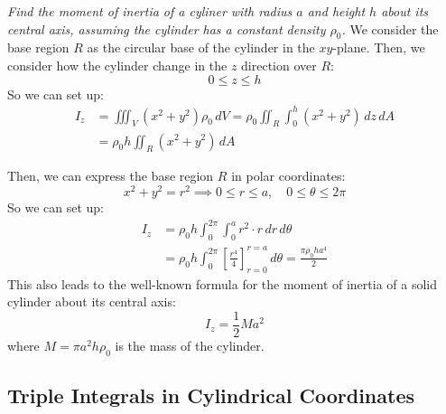 \documentclass[11pt]{report}
\begin{document}
\begin{example}
    \textit{Find the moment of inertia of a cyliner with radius $a$ and height $h$ about its central axis, assuming the cylinder has a constant density $\rho_0$.}
    We consider the base region $R$ as the circular base of the cylinder in the $xy$-plane. Then, we consider how the cylinder change in the $z$ direction over $R$:
    $$
        0 \le z \le h
    $$
    So we can set up:
    \begin{align*}
        I_z &= \iiint_V (x^2 + y^2) \rho_0 \, dV = \rho_0 \iint_R \int_0^h (x^2 + y^2) \, dz \, dA \\
        &= \rho_0 h \iint_R (x^2 + y^2) \, dA
    \end{align*}

    Then, we can express the base region $R$ in polar coordinates:
    $$        
    x^2 + y^2 = r^2 \implies 0 \le r \le a, \quad 0 \le \theta \le 2\pi
    $$
    So we can set up:
    \begin{align*}
        I_z &= \rho_0 h \int_0^{2\pi} \int_0^a r^2 \cdot r \, dr \, d\theta \\
        &= \rho_0 h \int_0^{2\pi} \left[ \frac{r^4}{4} \right]_{r=0}^{r=a} \, d\theta = \frac{\pi \rho_0 h a^4}{2}
    \end{align*}
    This also leads to the well-known formula for the moment of inertia of a solid cylinder about its central axis:
    $$
        I_z = \frac{1}{2} M a^2
    $$
    where $M = \pi a^2 h \rho_0$ is the mass of the cylinder. 
\end{example}
\subsection{Triple Integrals in Cylindrical Coordinates}
\end{document}
